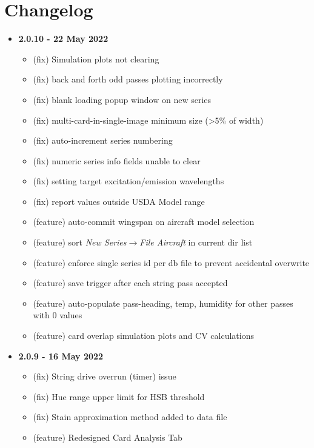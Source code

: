 \documentclass[10pt,letterpaper,titlepage]{article}
\begin{document}
    \newpage

    \section{Changelog}
    \begin{itemize}
        \item \textbf{2.0.10 - 22 May 2022}
        \begin{itemize}
            \item (fix) Simulation plots not clearing
            \item (fix) back and forth odd passes plotting incorrectly
            \item (fix) blank loading popup window on new series
            \item (fix) multi-card-in-single-image minimum size (>5\% of width)
            \item (fix) auto-increment series numbering
            \item (fix) numeric series info fields unable to clear
            \item (fix) setting target excitation/emission wavelengths
            \item (fix) report values outside USDA Model range
            \item (feature) auto-commit wingspan on aircraft model selection
            \item (feature) sort \textit{New Series$\rightarrow$File Aircraft} in current dir list
            \item (feature) enforce single series id per db file to prevent accidental overwrite
            \item (feature) save trigger after each string pass accepted
            \item (feature) auto-populate pass-heading, temp, humidity for other passes with 0 values
            \item (feature) card overlap simulation plots and CV calculations
        \end{itemize}
        \item \textbf{2.0.9 - 16 May 2022}
        \begin{itemize}
            \item (fix) String drive overrun (timer) issue
            \item (fix) Hue range upper limit for HSB threshold
            \item (fix) Stain approximation method added to data file
            \item (feature) Redesigned Card Analysis Tab

\end{itemize}
\end{itemize}
\end{document}
